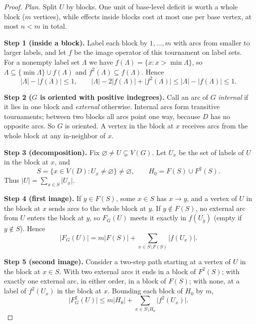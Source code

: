 \documentclass[11pt]{article}
\theoremstyle{remark}
\newcommand{\abs}[1]{\lvert #1\rvert}
\newcommand{\step}[1]{\par\smallskip\noindent\textbf{Step #1.}}
\begin{document}
\begin{proof}
\emph{Plan.} Split $U$ by blocks. One unit of base-level deficit is worth a
whole block ($m$ vertices), while effects inside blocks cost at most one per
base vertex, at most $n<m$ in total.

\step{1 (inside a block)} Label each block by $1,\dots,m$ with arcs from
smaller to larger labels, and let $f$ be the image operator of this tournament
on label sets. For a nonempty label set $\Lambda$ we have
$f(\Lambda)=\{x:x>\min\Lambda\}$, so
$\Lambda\subseteq\{\min\Lambda\}\cup f(\Lambda)$ and
$f^2(\Lambda)\subseteq f(\Lambda)$. Hence
\begin{equation}
\label{eq:internal-block-bound}
  \abs{\Lambda}-\abs{f(\Lambda)}\le1,\qquad
  \abs{\Lambda}-2\abs{f(\Lambda)}+\abs{f^2(\Lambda)}\le\abs{\Lambda}-\abs{f(\Lambda)}\le1.
\end{equation}

\step{2 ($G$ is oriented with positive indegrees)} Call an arc of $G$
\emph{internal} if it lies in one block and \emph{external} otherwise.
Internal arcs form transitive tournaments; between two blocks all arcs point
one way, because $D$ has no opposite arcs. So $G$ is oriented. A vertex in the
block at $x$ receives arcs from the whole block at any in-neighbor of $x$.

\step{3 (decomposition)} Fix $\varnothing\ne U\subsetneq V(G)$. Let $U_x$ be
the set of labels of $U$ in the block at $x$, and
\[
  S=\{x\in V(D):U_x\ne\varnothing\}\ne\varnothing,\qquad H_0=F(S)\cup F^2(S).
\]
Thus $\abs U=\sum_{x\in S}\abs{U_x}$.

\step{4 (first image)} If $y\in F(S)$, some $x\in S$ has $x\to y$, and a vertex
of $U$ in the block at $x$ sends arcs to the whole block at $y$. If
$y\notin F(S)$, no external arc from $U$ enters the block at $y$, so $F_G(U)$
meets it exactly in $f(U_y)$ (empty if $y\notin S$). Hence
\[
  \abs{F_G(U)}=m\abs{F(S)}+\sum_{x\in S\setminus F(S)}\abs{f(U_x)}.
\]

\step{5 (second image)} Consider a two-step path starting at a vertex of $U$
in the block at $x\in S$. With two external arcs it ends in a block of
$F^2(S)$; with exactly one external arc, in either order, in a block of
$F(S)$; with none, at a label of $f^2(U_x)$ in the block at $x$. Bounding each
block of $H_0$ by $m$,
\[
  \abs{F_G^2(U)}\le m\abs{H_0}+\sum_{x\in S\setminus H_0}\abs{f^2(U_x)}.
\]


\end{proof}
\end{document}

